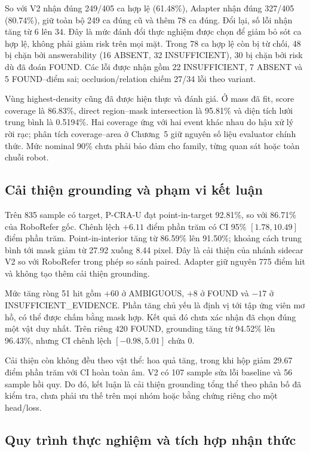 So với V2 nhận đúng 249/405 ca hợp lệ (61.48\%), Adapter nhận đúng
327/405 (80.74\%), giữ toàn bộ 249 ca đúng cũ và thêm 78 ca đúng.
Đổi lại, số lỗi nhận tăng từ 6 lên 34. Đây là mức đánh đổi thực nghiệm
được chọn để giảm bỏ sót ca hợp lệ, không phải giảm risk trên mọi mặt.
Trong 78 ca hợp lệ còn bị từ chối, 48 bị chặn bởi answerability
(16 ABSENT, 32 INSUFFICIENT), 30 bị chặn bởi risk dù đã đoán FOUND.
Các lỗi được nhận gồm 22 INSUFFICIENT, 7 ABSENT và 5 FOUND--điểm sai;
occlusion/relation chiếm 27/34 lỗi theo variant.

Vùng highest-density cũng đã được hiện thực và đánh giá. Ở mass đã
fit, score coverage là 86.83\%, direct region--mask intersection
là 95.81\% và diện tích lưới trung bình là 0.5194\%.
Hai coverage ứng với hai event khác nhau do hậu xử lý rời rạc;
phân tích coverage--area ở Chương~5 giữ nguyên số liệu evaluator
chính thức. Mức nominal 90\% chưa phải bảo đảm cho family, từng
quan sát hoặc toàn chuỗi robot.

\subsection{Cải thiện grounding và phạm vi kết luận}

Trên 835 sample có target, P-CRA-U đạt point-in-target 92.81\%,
so với 86.71\% của RoboRefer gốc. Chênh lệch $+6.11$ điểm phần trăm
có CI 95\% $[1.78,10.49]$ điểm phần trăm. Point-in-interior tăng
từ 86.59\% lên 91.50\%; khoảng cách trung bình tới mask giảm
từ 27.92 xuống 8.44 pixel. Đây là cải thiện của nhánh sidecar V2 so với RoboRefer trong phép so sánh paired. Adapter giữ nguyên 775 điểm hit và không tạo thêm cải thiện grounding.

Mức tăng ròng 51 hit gồm $+60$ ở AMBIGUOUS, $+8$ ở FOUND và $-17$
ở INSUFFICIENT\_EVIDENCE. Phần tăng chủ yếu là định vị tới tập
ứng viên mơ hồ, có thể được chấm bằng mask hợp. Kết quả đó chưa
xác nhận đã chọn đúng một vật duy nhất. Trên riêng 420 FOUND,
grounding tăng từ 94.52\% lên 96.43\%, nhưng CI chênh lệch
$[-0.98,5.01]$ chứa 0.

Cải thiện còn không đều theo vật thể: hoa quả tăng, trong khi
hộp giảm 29.67 điểm phần trăm với CI hoàn toàn âm. V2 có 107
sample sửa lỗi baseline và 56 sample hồi quy. Do đó, kết luận
là cải thiện grounding tổng thể theo phân bố đã kiểm tra,
chưa phải ưu thế trên mọi nhóm hoặc bằng chứng riêng cho một head/loss.

\subsection{Quy trình thực nghiệm và tích hợp nhận thức}

